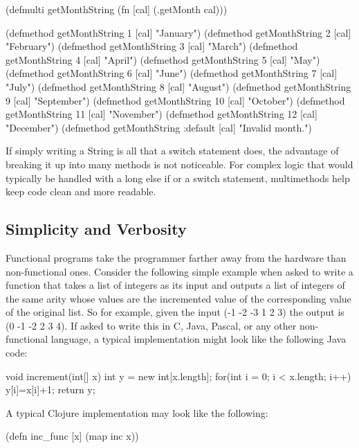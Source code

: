 (defmulti getMonthString (fn [cal] (.getMonth cal)))

(defmethod getMonthString 1 [cal] "January")
(defmethod getMonthString 2 [cal] "February")
(defmethod getMonthString 3 [cal] "March")
(defmethod getMonthString 4 [cal] "April")
(defmethod getMonthString 5 [cal] "May")
(defmethod getMonthString 6 [cal] "June")
(defmethod getMonthString 7 [cal] "July")
(defmethod getMonthString 8 [cal] "August")
(defmethod getMonthString 9 [cal] "September")
(defmethod getMonthString 10 [cal] "October")
(defmethod getMonthString 11 [cal] "November")
(defmethod getMonthString 12 [cal] "December")
(defmethod getMonthString :default [cal] "Invalid month.")

If simply writing a String is all that a switch statement does, the advantage of breaking it up into many
methods is not noticeable. For complex logic that would typically be handled with a long else if or a switch statement, 
multimethods help keep code clean and more readable.

\subsection{Simplicity and Verbosity}
Functional programs take the programmer farther away from the hardware than non-functional ones. Consider the following simple example when asked to write a function that takes a list of integers as its input and outputs a list of integers of the same arity whose values are the incremented value of the corresponding value of the original list. So for example, given the input (-1 -2 -3 1 2 3) the output is (0 -1 -2 2 3 4). If asked to write this in C, Java, Pascal, or any other non-functional language, a typical implementation might look like the following Java code: 

void increment(int[] x) {
	int y = new int[x.length];
	for(int i = 0; i < x.length; i++) { 
	  y[i]=x[i]+1;
         }
         return y;
}

A typical Clojure implementation may look like the following: 

(defn inc_func [x] (map inc x))

